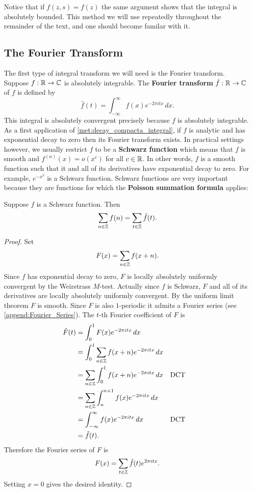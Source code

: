         Notice that if $f(z,s) = f(z)$ the same argument shows that the integral is absolutely bounded. This method we will use repeatedly throughout the remainder of the text, and one should become familar with it.
      \subsection*{The Fourier Transform}
        The first type of integral transform we will need is the Fourier transform. Suppose $f:\mathbb{R} \to \mathbb{C}$ is absolutely integrable. The \textbf{Fourier transform} $\hat{f}:\mathbb{R} \to \mathbb{C}$ of $f$ is defined by
        \[
          \hat{f}(t) = \int_{-\infty}^{\infty}f(x)e^{-2\pi itx}\,dx.
        \]
        This integral is absolutely convergent precisely because $f$ is absolutely integrable. As a first application of \cref{met:decay_compacta_integral}, if $f$ is analytic and has exponential decay to zero then its Fourier transform exists. In practical settings however, we usually restrict $f$ to be a \textbf{Schwarz function} which means that $f$ is smooth and $f^{(n)}(x) = o(x^{c})$ for all $c \in \mathbb{R}$. In other words, $f$ is a smooth function such that it and all of its derivatives have exponential decay to zero. For example, $e^{-x^{2}}$ is a Schwarz function. Schwarz functions are very important because they are functions for which the \textbf{Poisson summation formula} applies:

        \begin{theorem}
          Suppose $f$ is a Schwarz function. Then
          \[
            \sum_{n \in \mathbb{Z}}f(n) = \sum_{t \in \mathbb{Z}}\hat{f}(t).
          \]
        \end{theorem}
        \begin{proof}
          Set
          \[
            F(x) = \sum_{n \in \mathbb{Z}}f(x+n).
          \]
          Since $f$ has exponential decay to zero, $F$ is locally absolutely uniformly convergent by the Weirstrass $M$-test. Actually since $f$ is Schwarz, $F$ and all of its derivatives are locally absolutely uniformly convergent. By the uniform limit theorem $F$ is smooth. Since $F$ is also $1$-periodic it admits a Fourier series (see \cref{append:Fourier_Series}). The $t$-th Fourier coefficient of $F$ is
          \begin{align*}
            \hat{F}(t) &= \int_{0}^{1}F(x)e^{-2\pi itx}\,dx \\
            &= \int_{0}^{1}\sum_{n \in \mathbb{Z}}f(x+n)e^{-2\pi itx}\,dx \\
            &= \sum_{n \in \mathbb{Z}}\int_{0}^{1}f(x+n)e^{-2\pi itx}\,dx && \text{DCT} \\
            &= \sum_{n \in \mathbb{Z}}\int_{n}^{n+1}f(x)e^{-2\pi itx}\,dx \\
            &= \int_{-\infty}^{\infty}f(x)e^{-2\pi itx}\,dx && \text{DCT} \\
            &= \hat{f}(t).
          \end{align*}
          Therefore the Fourier series of $F$ is
          \[
            F(x) = \sum_{t \in \mathbb{Z}}\hat{f}(t)e^{2\pi itx}.
          \]
          Setting $x = 0$ gives the desired identity.
        \end{proof}

